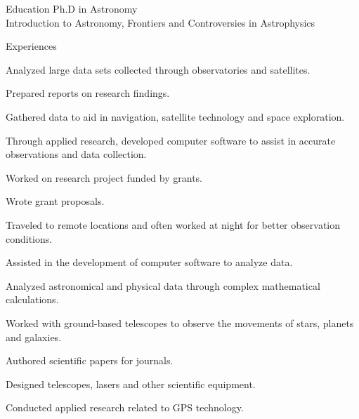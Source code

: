 \documentclass[11pt,final,a4paper]{que_cv}
\def\ASDIR{../assets}
\begin{document}
%
\setlogo{\ASDIR/abyss}
%
\showinfo
%
\begin{cvsection}{Education}
   Ph.D in Astronomy\\
   Introduction to Astronomy, Frontiers and Controversies in Astrophysics
\end{cvsection}
%
\begin{cvsection}{Experiences}
  \begin{entrylist}
  \item Analyzed large data sets collected through observatories and satellites. \item Prepared reports on research findings.
  \item Gathered data to aid in navigation, satellite technology and space exploration.
  \item Through applied research, developed computer software to assist in accurate observations and data collection.
  \end{entrylist}
  \begin{entrylist}
  \item Worked on research project funded by grants.
  \item Wrote grant proposals.
  \item Traveled to remote locations and often worked at night for better observation conditions.
  \item Assisted in the development of computer software to analyze data.
  \item Analyzed astronomical and physical data through complex mathematical calculations.
  \end{entrylist}
  \begin{entrylist}
  \item Worked with ground-based telescopes to observe the movements of stars, planets and galaxies.
  \item Authored scientific papers for journals.
  \item Designed telescopes, lasers and other scientific equipment.
  \item Conducted applied research related to GPS technology.
  \end{entrylist}
\end{cvsection}
\end{document}

